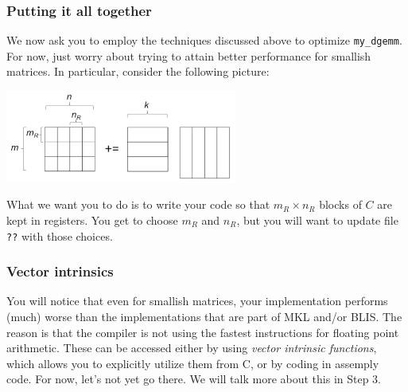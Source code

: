 \subsubsection{Putting it all together}

We now ask you to employ the techniques discussed above to optimize {\tt my\_dgemm}.  For now, just worry about trying to attain better performance for smallish matrices.  In particular, consider the following picture:
\begin{center}
	\includegraphics[width=3in]{figures/Step2.pdf}
\end{center}
What we want you to do is to write your code so that $ m_R \times n_R $ blocks of $ C $ are kept in registers.  
You get to choose $ m_R $ and $ n_R $, but you will want to update file {\tt ??} with those choices.

\subsubsection{Vector intrinsics}

You will notice that even for smallish matrices, your implementation performs (much) worse than the implementations that are part of MKL and/or BLIS.  
The reason is that the compiler is not using the fastest instructions for floating point arithmetic.  These can be accessed either by using {\em vector intrinsic functions}, which allows you to explicitly utilize them from C, or by coding in assemply code.  For now, let's not yet go there.  We will talk more about this in Step 3.